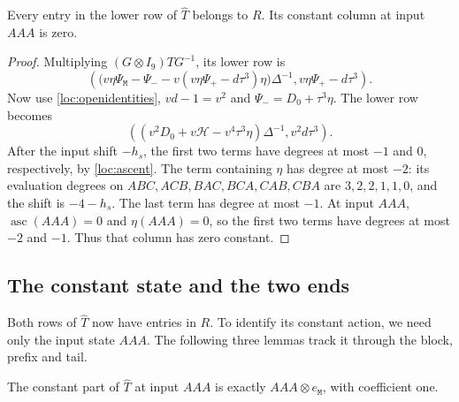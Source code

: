 \documentclass[a4paper,11pt]{amsart}
\newcommand{\wordmiddle}{\mathtt{M}}
\newcommand{\middlemap}{{\Psi}_{{\wordmiddle}}}
\newcommand{\createmap}{{\Psi}_+}
\newcommand{\removemap}{{\Psi}_-}
\newcommand{\tpar}{v}
\numberwithin{equation}{subsection}
\theoremstyle{plain}
\theoremstyle{definition}
\theoremstyle{remark}
\begin{document}
\begin{lemma}\label{loc:lowerrow}
Every entry in the lower row of $\widehat T$ belongs to $R$.
Its constant column at input $AAA$ is zero.
\end{lemma}

\begin{proof}
Multiplying $(G\otimes I_9)TG^{-1}$, its lower row is
\[
\left(
\bigl(\tpar\eta \middlemap-\removemap-\tpar(\tpar\eta \createmap-d\tau^3)\eta\bigr)\Delta^{-1},
\tpar\eta \createmap-d\tau^3
\right).
\]
Now use \autoref{loc:openidentities}, $\tpar d-1=\tpar^2$ and
$\removemap=D_0+\tau^3\eta$. The lower row becomes
\begin{equation}\label{loc:lowerformula}
\left((\tpar^2D_0+\tpar\mathcal H-\tpar^4\tau^3\eta)\Delta^{-1},\tpar^2d\tau^3\right).
\end{equation}
After the input shift $-h_s$, the first two terms have degrees
at most $-1$ and $0$, respectively,
by \autoref{loc:ascent}. The term containing $\eta$ has degree at most $-2$: its evaluation degrees on $ABC,ACB,BAC,BCA,CAB,CBA$ are $3,2,2,1,1,0$, and the shift is $-4-h_s$. The last term has degree at most $-1$.
At input $AAA$, $\operatorname{asc}(AAA)=0$ and $\eta(AAA)=0$, so the first two terms have
degrees at most $-2$ and $-1$. Thus that column has zero constant.
\end{proof}

\subsection{The constant state and the two ends}\label{loc:ends}

Both rows of $\widehat T$ now have entries in $R$. To identify its
constant action, we need only the input state $AAA$. The following
three lemmas track it through the block, prefix and tail.

\begin{lemma}\label{loc:constantblock}
The constant part of $\widehat T$ at input $AAA$ is exactly
$AAA\otimes e_{\wordmiddle}$, with coefficient one.
\end{lemma}
\end{document}
